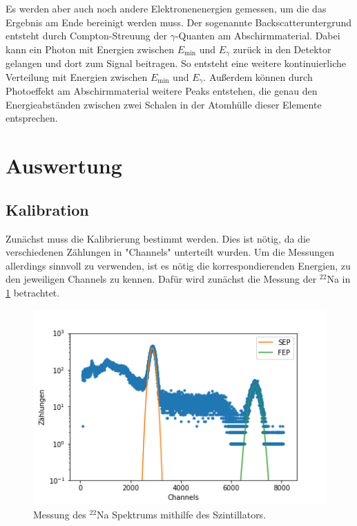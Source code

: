 Es werden aber auch noch andere Elektronenenergien gemessen, um die das Ergebnis am Ende bereinigt werden muss. Der sogenannte Backscatteruntergrund entsteht durch Compton-Streuung der $\gamma$-Quanten am Abschirmmaterial. Dabei kann ein Photon mit Energien zwischen $E_\text{min}$ und $E_\gamma$ zurück in den Detektor gelangen und dort zum Signal beitragen. So entsteht eine weitere kontinuierliche Verteilung mit Energien zwischen $E_\text{min}$ und $E_\gamma$. Außerdem können durch Photoeffekt am Abschirmmaterial weitere Peaks entstehen, die genau den Energieabständen zwischen zwei Schalen in der Atomhülle dieser Elemente entsprechen.


\section{Auswertung}
\subsection{Kalibration}
Zunächst muss die Kalibrierung bestimmt werden. Dies ist nötig, da die verschiedenen Zählungen in "Channels" unterteilt wurden. Um die Messungen allerdings sinnvoll zu verwenden, ist es nötig die korrespondierenden Energien, zu den jeweiligen Channels zu kennen. Dafür wird zunächst die Messung der $^{22}$Na in \cref{Kali} betrachtet.

\begin{figure}[ht]
	\centering
	\includegraphics[scale=0.8]{na.png}
	\caption{Messung des $^{22}$Na Spektrums mithilfe des Szintillators.}
	\label{Kali}
\end{figure}

